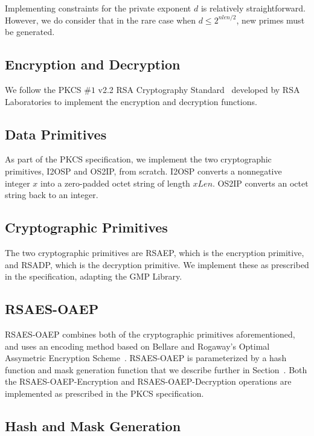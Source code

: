 \documentclass[a4paper]{article}
\begin{document}
Implementing constraints for the private exponent $d$ is relatively straightforward. However, we do consider that in the rare case when $d \leq 2^{nlen/2}$, new primes must be generated.

\subsection{Encryption and Decryption}

We follow the PKCS $\#1$ v2.2 RSA Cryptography Standard~\cite{rsa2012pkcs} developed by RSA Laboratories to implement the encryption and decryption functions.

\subsection{Data Primitives}

As part of the PKCS specification, we implement the two cryptographic primitives, I2OSP and OS2IP, from scratch. I2OSP converts a nonnegative integer $x$ into a zero-padded octet string of length $xLen$. OS2IP converts an octet string back to an integer.

\subsection{Cryptographic Primitives}

The two cryptographic primitives are RSAEP, which is the encryption primitive, and RSADP, which is the decryption primitive. We implement these as prescribed in the specification, adapting the GMP Library.

\subsection{RSAES-OAEP}

RSAES-OAEP combines both of the cryptographic primitives aforementioned, and uses an encoding method based on Bellare and Rogaway's Optimal Assymetric Encryption Scheme~\cite{bellare1994optimal}. RSAES-OAEP is parameterized by a hash function and mask generation function that we describe further in Section~\cite{sec:hash}. Both the RSAES-OAEP-Encryption and RSAES-OAEP-Decryption operations are implemented as prescribed in the PKCS specification.


\subsection{Hash and Mask Generation}\label{sec:hash}
\end{document}
